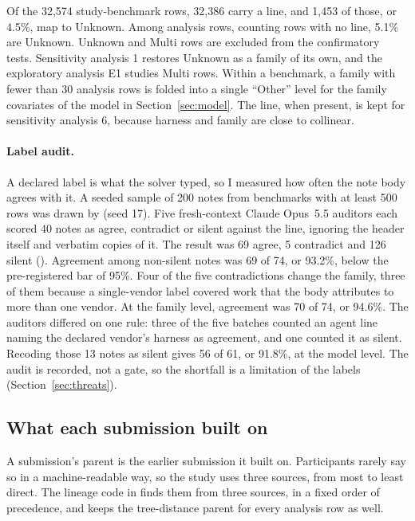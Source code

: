 Of the 32,574 study-benchmark rows, 32,386 carry a  line, and 1,453 of those, or 4.5\%, map to Unknown.
Among analysis rows, counting rows with no  line, 5.1\% are Unknown.
Unknown and Multi rows are excluded from the confirmatory tests.
Sensitivity analysis 1 restores Unknown as a family of its own, and the exploratory analysis E1 studies Multi rows.
Within a benchmark, a family with fewer than 30 analysis rows is folded into a single ``Other'' level for the family covariates of the model in Section~\ref{sec:model}.
The  line, when present, is kept for sensitivity analysis 6, because harness and family are close to collinear.

\paragraph{Label audit.}
A declared label is what the solver typed, so I measured how often the note body agrees with it.
A seeded sample of 200 notes from benchmarks with at least 500 rows was drawn by  (seed 17).
Five fresh-context Claude Opus~5.5 auditors each scored 40 notes as agree, contradict or silent against the  line, ignoring the header itself and verbatim copies of it.
The result was 69 agree, 5 contradict and 126 silent ().
Agreement among non-silent notes was 69 of 74, or 93.2\%, below the pre-registered bar of 95\%.
Four of the five contradictions change the family, three of them because a single-vendor label covered work that the body attributes to more than one vendor.
At the family level, agreement was 70 of 74, or 94.6\%.
The auditors differed on one rule: three of the five batches counted an agent line naming the declared vendor's harness as agreement, and one counted it as silent.
Recoding those 13 notes as silent gives 56 of 61, or 91.8\%, at the model level.
The audit is recorded, not a gate, so the shortfall is a limitation of the labels (Section~\ref{sec:threats}).

\subsection{What each submission built on}
\label{sec:parents}

A submission's parent is the earlier submission it built on.
Participants rarely say so in a machine-readable way, so the study uses three sources, from most to least direct.
The lineage code in  finds them from three sources, in a fixed order of precedence, and keeps the tree-distance parent for every analysis row as well.

